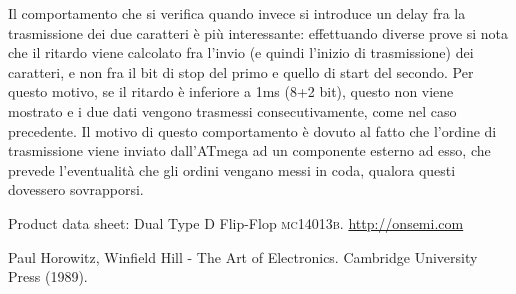 \documentclass[journal, a4paper]{IEEEtran}
\begin{document}
Il comportamento che si verifica quando invece si introduce un delay fra la trasmissione dei due caratteri è più interessante: effettuando diverse prove si nota che il ritardo viene calcolato fra l'invio (e quindi l'inizio di trasmissione) dei caratteri, e non fra il bit di stop del primo e quello di start del secondo. Per questo motivo, se il ritardo è inferiore a 1ms (8+2 bit), questo non viene mostrato e i due dati vengono trasmessi consecutivamente, come nel caso precedente. Il motivo di questo comportamento è dovuto al fatto che l'ordine di trasmissione viene inviato dall'ATmega ad un componente esterno ad esso, che prevede l'eventualità che gli ordini vengano messi in coda, qualora questi dovessero sovrapporsi.

\begin{thebibliography}{5}

	
	Product data sheet: Dual Type D Flip-Flop \textsc{mc14013b}.
	\url{http://onsemi.com}

	Paul Horowitz, Winfield Hill - The Art of Electronics. Cambridge University Press (1989).
	
\end{thebibliography}
\end{document}
